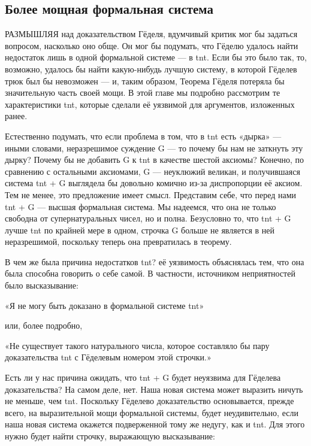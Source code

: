 \documentclass[../main.tex]{subfiles}
\begin{document}

\subsection{Более мощная формальная система}

РАЗМЫШЛЯЯ над доказательством Гёделя, вдумчивый критик мог бы задаться вопросом, насколько оно обще. Он мог бы подумать, что Гёделю удалось найти недостаток лишь в одной формальной системе --- в \acs{tnt}\@. Если бы это было так, то, возможно, удалось бы найти какую-нибудь лучшую систему, в которой Гёделев трюк был бы невозможен --- и, таким образом, Теорема Гёделя потеряла бы значительную часть своей мощи. В этой главе мы подробно рассмотрим те характеристики \acs{tnt}, которые сделали её уязвимой для аргументов, изложенных ранее.

Естественно подумать, что если проблема в том, что в \acs{tnt} есть «дырка» --- иными словами, неразрешимое суждение G --- то почему бы нам не заткнуть эту дырку? Почему бы не добавить G к \acs{tnt} в качестве шестой аксиомы? Конечно, по сравнению с остальными аксиомами, G --- неуклюжий великан, и получившаяся система \acs{tnt} + G выглядела бы довольно комично из-за диспропорции её аксиом. Тем не менее, это предложение имеет смысл. Представим себе, что перед нами \acs{tnt} + G --- высшая формальная система. Мы надеемся, что она не только свободна от супернатуральных чисел, но и полна. Безусловно то, что \acs{tnt} + G лучше \acs{tnt} по крайней мере в одном, строчка G больше не является в ней неразрешимой, поскольку теперь она превратилась в теорему.

В чем же была причина недостатков \acs{tnt}? её уязвимость объяснялась тем, что она была способна говорить о себе самой. В частности, источником неприятностей было высказывание:

«Я не могу быть доказано в формальной системе \acs{tnt}»

или, более подробно,

«Не существует такого натурального числа, которое составляло бы пару доказательства \acs{tnt} с Гёделевым номером этой строчки.»

Есть ли у нас причина ожидать, что \acs{tnt} + G будет неуязвима для Гёделева доказательства? На самом деле, нет. Наша новая система может выразить ничуть не меньше, чем \acs{tnt}\@. Поскольку Гёделево доказательство основывается, прежде всего, на выразительной мощи формальной системы, будет неудивительно, если наша новая система окажется подверженной тому же недугу, как и \acs{tnt}\@. Для этого нужно будет найти строчку, выражающую высказывание:
\end{document}
